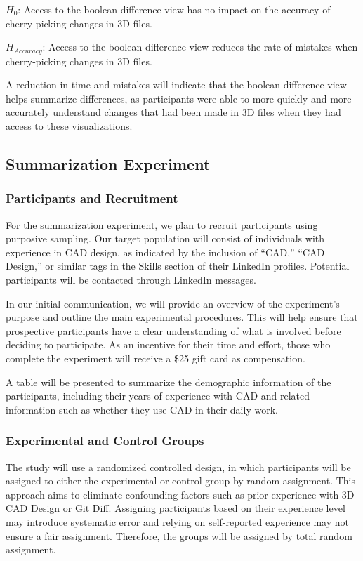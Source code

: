 \documentclass[sigconf,authorversion,nonacm]{acmart}
\begin{document}
$H_{0}$: Access to the boolean difference view has no impact on the accuracy of cherry-picking changes in 3D files.

$H_{Accuracy}$: Access to the boolean difference view reduces the rate of mistakes when cherry-picking changes in 3D files.

A reduction in time and mistakes will indicate that the boolean difference view helps summarize differences, as participants were able to more quickly and more accurately understand changes that had been made in 3D files when they had access to these visualizations.

\subsection{Summarization Experiment}
\subsubsection{Participants and Recruitment}
For the summarization experiment, we plan to recruit participants using purposive sampling. Our target population will consist of individuals with experience in CAD design, as indicated by the inclusion of ``CAD,'' ``CAD Design,''
or similar tags in the Skills section of their LinkedIn profiles. Potential participants will be contacted through LinkedIn messages.

In our initial communication, we will provide an overview of the experiment's purpose and outline the main experimental procedures.
This will help ensure that prospective participants have a clear understanding of what is involved before deciding to participate. As an incentive for their time and effort, those who complete the experiment will receive a \$25 gift card as compensation.

A table will be presented to summarize the demographic information of the participants, including their years of experience with CAD and related information such as whether they use CAD in their daily work.

\subsubsection{Experimental and Control Groups}

The study will use a randomized controlled design, in which participants will be assigned to either the experimental or control group by random assignment. This approach aims to eliminate confounding factors such as prior experience with 3D CAD Design or Git Diff. Assigning participants based on their experience level may introduce systematic error and relying on self-reported experience may not ensure a fair assignment. Therefore, the groups will be assigned by total random assignment.
\end{document}
